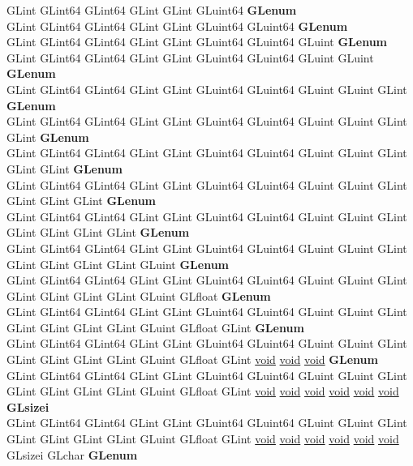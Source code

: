 \begin{DoxyCompactItemize}
\begin{tabbing}
\>GLint GLint64 GLint64 GLint GLint GLuint64 {\bfseries GLenum}\\
\>GLint GLint64 GLint64 GLint GLint GLuint64 GLuint64 {\bfseries GLenum}\\
\>GLint GLint64 GLint64 GLint GLint GLuint64 GLuint64 GLuint {\bfseries GLenum}\\
\>GLint GLint64 GLint64 GLint GLint GLuint64 GLuint64 GLuint GLuint {\bfseries GLenum}\\
\>GLint GLint64 GLint64 GLint GLint GLuint64 GLuint64 GLuint GLuint GLint {\bfseries GLenum}\\
\>GLint GLint64 GLint64 GLint GLint GLuint64 GLuint64 GLuint GLuint GLint GLint {\bfseries GLenum}\\
\>GLint GLint64 GLint64 GLint GLint GLuint64 GLuint64 GLuint GLuint GLint GLint GLint {\bfseries GLenum}\\
\>GLint GLint64 GLint64 GLint GLint GLuint64 GLuint64 GLuint GLuint GLint GLint GLint GLint {\bfseries GLenum}\\
\>GLint GLint64 GLint64 GLint GLint GLuint64 GLuint64 GLuint GLuint GLint GLint GLint GLint GLint {\bfseries GLenum}\\
\>GLint GLint64 GLint64 GLint GLint GLuint64 GLuint64 GLuint GLuint GLint GLint GLint GLint GLint GLuint {\bfseries GLenum}\\
\>GLint GLint64 GLint64 GLint GLint GLuint64 GLuint64 GLuint GLuint GLint GLint GLint GLint GLint GLuint GLfloat {\bfseries GLenum}\\
\>GLint GLint64 GLint64 GLint GLint GLuint64 GLuint64 GLuint GLuint GLint GLint GLint GLint GLint GLuint GLfloat GLint {\bfseries GLenum}\\
\>GLint GLint64 GLint64 GLint GLint GLuint64 GLuint64 GLuint GLuint GLint GLint GLint GLint GLint GLuint GLfloat GLint \hyperlink{interfacevoid}{void} \hyperlink{interfacevoid}{void} \hyperlink{interfacevoid}{void} {\bfseries GLenum}\\
\>GLint GLint64 GLint64 GLint GLint GLuint64 GLuint64 GLuint GLuint GLint GLint GLint GLint GLint GLuint GLfloat GLint \hyperlink{interfacevoid}{void} \hyperlink{interfacevoid}{void} \hyperlink{interfacevoid}{void} \hyperlink{interfacevoid}{void} \hyperlink{interfacevoid}{void} \hyperlink{interfacevoid}{void} {\bfseries GLsizei}\\
\>GLint GLint64 GLint64 GLint GLint GLuint64 GLuint64 GLuint GLuint GLint GLint GLint GLint GLint GLuint GLfloat GLint \hyperlink{interfacevoid}{void} \hyperlink{interfacevoid}{void} \hyperlink{interfacevoid}{void} \hyperlink{interfacevoid}{void} \hyperlink{interfacevoid}{void} \hyperlink{interfacevoid}{void} GLsizei GLchar {\bfseries GLenum}\\

\end{tabbing}
\end{DoxyCompactItemize}

